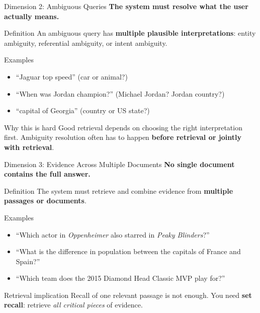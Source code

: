 \documentclass[aspectratio=169, xcolor=table]{beamer}
\newif\ifanimated
\newcommand{\cpause}{\ifanimated\pause\fi}
\begin{document}
\begin{frame}[shrink=10]{Dimension 2: Ambiguous Queries}
\textbf{The system must resolve what the user actually means.}

\vspace{0.7em}
\begin{block}{Definition}
An ambiguous query has \textbf{multiple plausible interpretations}:
entity ambiguity, referential ambiguity, or intent ambiguity.
\end{block}

\cpause
\begin{block}{Examples}
\begin{itemize}
  \item ``Jaguar top speed'' \hfill (car or animal?)
  \item ``When was Jordan champion?'' \hfill (Michael Jordan? Jordan country?)
  \item ``capital of Georgia'' \hfill (country or US state?)
\end{itemize}
\end{block}

\cpause
\begin{block}{Why this is hard}
Good retrieval depends on choosing the right interpretation first.
Ambiguity resolution often has to happen \textbf{before retrieval or jointly with retrieval}.
\end{block}
\end{frame}

\begin{frame}[shrink=10]{Dimension 3: Evidence Across Multiple Documents}
\textbf{No single document contains the full answer.}

\vspace{0.7em}
\begin{block}{Definition}
The system must retrieve and combine evidence from \textbf{multiple passages or documents}.
\end{block}

\cpause
\begin{block}{Examples}
\begin{itemize}
  \item ``Which actor in \emph{Oppenheimer} also starred in \emph{Peaky Blinders}?'' 
  \item ``What is the difference in population between the capitals of France and Spain?''
  \item ``Which team does the 2015 Diamond Head Classic MVP play for?'' 
\end{itemize}
\end{block}

\cpause
\begin{block}{Retrieval implication}
Recall of one relevant passage is not enough.
You need \textbf{set recall}: retrieve \emph{all critical pieces} of evidence.
\end{block}
\end{frame}
\end{document}
